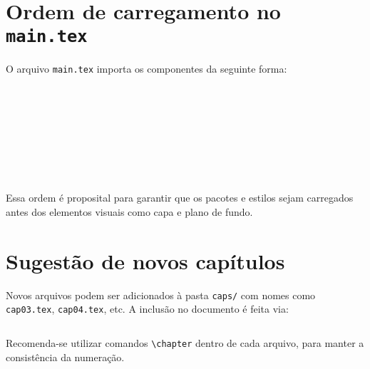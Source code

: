 \section{Ordem de carregamento no \texttt{main.tex}}

O arquivo \texttt{main.tex} importa os componentes da seguinte forma:

\begin{verbatim}









\end{verbatim}

Essa ordem é proposital para garantir que os pacotes e estilos sejam carregados antes dos elementos visuais como capa e plano de fundo.

\section{Sugestão de novos capítulos}

Novos arquivos podem ser adicionados à pasta \texttt{caps/} com nomes como \texttt{cap03.tex}, \texttt{cap04.tex}, etc. A inclusão no documento é feita via:

\begin{verbatim}

\end{verbatim}

Recomenda-se utilizar comandos \verb|\chapter| dentro de cada arquivo, para manter a consistência da numeração.


